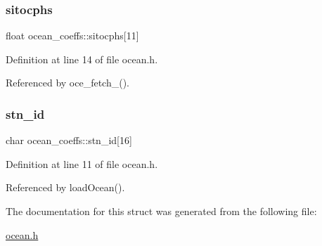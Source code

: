 \mbox{\label{structocean__coeffs_aee716356287de77fa21fa2f0c91ee603}} 
\subsubsection{\texorpdfstring{sitocphs}{sitocphs}}
{\footnotesize\ttfamily float ocean\+\_\+coeffs\+::sitocphs\mbox{[}11\mbox{]}}



Definition at line 14 of file ocean.\+h.



Referenced by oce\+\_\+fetch\+\_\+().

\mbox{\label{structocean__coeffs_a50b3096650d5ecc838c8ec5ac89c1047}} 
\subsubsection{\texorpdfstring{stn\+\_\+id}{stn\_id}}
{\footnotesize\ttfamily char ocean\+\_\+coeffs\+::stn\+\_\+id\mbox{[}16\mbox{]}}



Definition at line 11 of file ocean.\+h.



Referenced by load\+Ocean().



The documentation for this struct was generated from the following file\+:\begin{DoxyCompactItemize}
\item 
\hyperlink{ocean_8h}{ocean.\+h}\end{DoxyCompactItemize}
